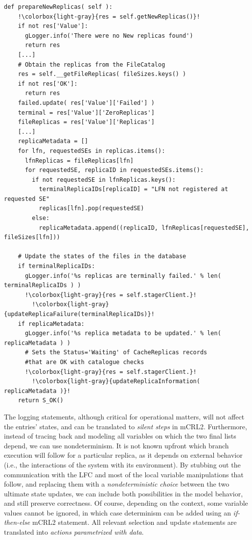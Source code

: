 \documentclass[sort&compress,preprint,3p]{elsarticle}
\begin{document}
\begin{lstlisting}[label=listing2,escapechar=!,basicstyle=\ttfamily\fontsize{8}{7}\ \selectfont]
  def prepareNewReplicas( self ):
    !\colorbox{light-gray}{res = self.getNewReplicas()}!
    if not res['Value']:
      gLogger.info('There were no New replicas found')
      return res
    [...]
    # Obtain the replicas from the FileCatalog
    res = self.__getFileReplicas( fileSizes.keys() )
    if not res['OK']:
      return res
    failed.update( res['Value']['Failed'] )
    terminal = res['Value']['ZeroReplicas']
    fileReplicas = res['Value']['Replicas']
    [...]
    replicaMetadata = []
    for lfn, requestedSEs in replicas.items():
      lfnReplicas = fileReplicas[lfn]
      for requestedSE, replicaID in requestedSEs.items():
        if not requestedSE in lfnReplicas.keys():
          terminalReplicaIDs[replicaID] = "LFN not registered at requested SE"
          replicas[lfn].pop(requestedSE)
        else:
          replicaMetadata.append((replicaID, lfnReplicas[requestedSE], fileSizes[lfn]))

    # Update the states of the files in the database
    if terminalReplicaIDs:
      gLogger.info('%s replicas are terminally failed.' % len( terminalReplicaIDs ) )
      !\colorbox{light-gray}{res = self.stagerClient.}!
	    !\colorbox{light-gray}{updateReplicaFailure(terminalReplicaIDs)}!
    if replicaMetadata:
      gLogger.info('%s replica metadata to be updated.' % len( replicaMetadata ) )
      # Sets the Status='Waiting' of CacheReplicas records 
      #that are OK with catalogue checks
      !\colorbox{light-gray}{res = self.stagerClient.}!
	    !\colorbox{light-gray}{updateReplicaInformation( replicaMetadata )}!
    return S_OK()   
\end{lstlisting}
The logging statements, although critical for operational matters, will
not affect the entries' states, and can be translated to \textit{silent steps} in mCRL2.
Furthermore, instead of tracing back and modeling all variables on which 
the two final lists depend, we can use nondeterminism. 
It is not known upfront which branch execution will follow
for a particular replica, as it depends on external behavior (i.e., the interactions of the system with its environment).
By stubbing out the communication with the LFC and
most of the local variable manipulations 
that follow, and replacing them with a \textit{nondeterministic choice} between the two
ultimate state updates, we can include both possibilities in the model behavior,
and still preserve correctness. Of course, depending on the context, some 
variable values cannot be ignored, in which case determinism can be added
using an \textit{if-then-else} mCRL2 statement. All relevant selection and update 
statements are translated into \textit{actions parametrized with data}.
\end{document}
